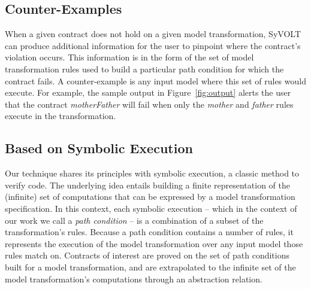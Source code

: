 \subsection{Counter-Examples}

When a given contract does not hold on a given model transformation,
SyVOLT can produce additional information for the user to pinpoint where
the contract's violation occurs. This information is in
the form of the set of model transformation rules used to build a particular
path condition for which the contract fails. A counter-example is any input model where this set of rules would execute. For example, the sample output in Figure~\ref{fig:output} alerts the user that the contract \textit{motherFather} will fail when only the \textit{mother} and \textit{father} rules execute in the transformation.

\subsection{Based on Symbolic Execution}

Our technique shares its principles with symbolic execution, a classic method to
verify code. The underlying idea entails building a finite representation of the
(infinite) set of computations that can be expressed by a model transformation
specification. In this context, each symbolic execution -- which in the context
of our work we call a \emph{path condition} -- is a combination
of a subset of the transformation's rules.
Because a path condition contains a number of rules, it represents the execution
of the model transformation over any input model those rules match on.
Contracts of interest are proved on the set of path conditions built for a
model transformation, and are extrapolated to the infinite set of
the model transformation's computations through an abstraction relation.




